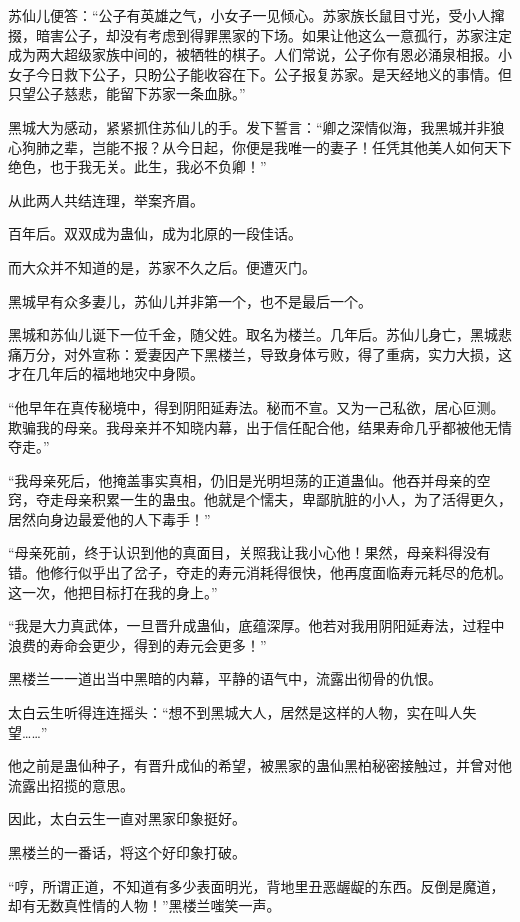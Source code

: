 \begin{this_body}
苏仙儿便答：“公子有英雄之气，小女子一见倾心。苏家族长鼠目寸光，受小人撺掇，暗害公子，却没有考虑到得罪黑家的下场。如果让他这么一意孤行，苏家注定成为两大超级家族中间的，被牺牲的棋子。人们常说，公子你有恩必涌泉相报。小女子今日救下公子，只盼公子能收容在下。公子报复苏家。是天经地义的事情。但只望公子慈悲，能留下苏家一条血脉。”

黑城大为感动，紧紧抓住苏仙儿的手。发下誓言：“卿之深情似海，我黑城并非狼心狗肺之辈，岂能不报？从今日起，你便是我唯一的妻子！任凭其他美人如何天下绝色，也于我无关。此生，我必不负卿！”

从此两人共结连理，举案齐眉。

百年后。双双成为蛊仙，成为北原的一段佳话。

而大众并不知道的是，苏家不久之后。便遭灭门。

黑城早有众多妻儿，苏仙儿并非第一个，也不是最后一个。

黑城和苏仙儿诞下一位千金，随父姓。取名为楼兰。几年后。苏仙儿身亡，黑城悲痛万分，对外宣称：爱妻因产下黑楼兰，导致身体亏败，得了重病，实力大损，这才在几年后的福地地灾中身陨。

“他早年在真传秘境中，得到阴阳延寿法。秘而不宣。又为一己私欲，居心叵测。欺骗我的母亲。我母亲并不知晓内幕，出于信任配合他，结果寿命几乎都被他无情夺走。”

“我母亲死后，他掩盖事实真相，仍旧是光明坦荡的正道蛊仙。他吞并母亲的空窍，夺走母亲积累一生的蛊虫。他就是个懦夫，卑鄙肮脏的小人，为了活得更久，居然向身边最爱他的人下毒手！”

“母亲死前，终于认识到他的真面目，关照我让我小心他！果然，母亲料得没有错。他修行似乎出了岔子，夺走的寿元消耗得很快，他再度面临寿元耗尽的危机。这一次，他把目标打在我的身上。”

“我是大力真武体，一旦晋升成蛊仙，底蕴深厚。他若对我用阴阳延寿法，过程中浪费的寿命会更少，得到的寿元会更多！”

黑楼兰一一道出当中黑暗的内幕，平静的语气中，流露出彻骨的仇恨。

太白云生听得连连摇头：“想不到黑城大人，居然是这样的人物，实在叫人失望……”

他之前是蛊仙种子，有晋升成仙的希望，被黑家的蛊仙黑柏秘密接触过，并曾对他流露出招揽的意思。

因此，太白云生一直对黑家印象挺好。

黑楼兰的一番话，将这个好印象打破。

“哼，所谓正道，不知道有多少表面明光，背地里丑恶龌龊的东西。反倒是魔道，却有无数真性情的人物！”黑楼兰嗤笑一声。


\end{this_body}
